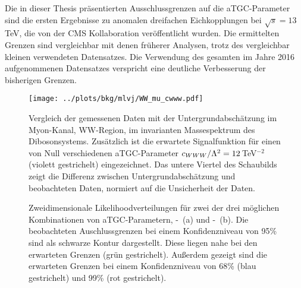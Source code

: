 Die in dieser Thesis präsentierten Ausschlussgrenzen auf die aTGC-Parameter sind die ersten Ergebnisse zu anomalen dreifachen Eichkopplungen bei $\sqrt{s}=13$\,TeV, die von der CMS Kollaboration veröffentlicht wurden. Die ermittelten Grenzen sind vergleichbar mit denen früherer Analysen, trotz des vergleichbar kleinen verwendeten Datensatzes. Die Verwendung des gesamten im Jahre 2016 aufgenommenen Datensatzes verspricht eine deutliche Verbesserung der bisherigen Grenzen.


\begin{figure}
    \centering
    \resizebox{0.8\columnwidth}{!}
    {%
    \texttt{[image: ../plots/bkg/mlvj/WW\_mu\_cwww.pdf]}
    \caption[Vergleich der gemessenen Daten mit der Untergrundabschätzung sowie zweidimensionale Ausschlussgrenzen auf \Tccw -\Tcb]{Vergleich der gemessenen Daten mit der Untergrundabschätzung im Myon-Kanal, WW-Region, im invarianten Massespektrum des Dibosonsystems. Zusätzlich ist die erwartete Signalfunktion für einen von Null verschiedenen aTGC-Parameter $c_{WWW}/\Lambda^2=12$\,TeV$^{-2}$ (violett gestrichelt) eingezeichnet. Das untere Viertel des Schaubilds zeigt die Differenz zwischen Untergrundabschätzung und beobachteten Daten, normiert auf die Unsicherheit der Daten.}
    \label{fig:intro_ger:WW}
    }
\end{figure}

\begin{figure}
	\centering
	\caption[Zweidimensionale Likelihoodverteilungen für zwei mögliche Kombinationen von aTGC-Parametern]{Zweidimensionale Likelihoodverteilungen für zwei der drei möglichen Kombinationen von aTGC-Parametern, \Tcwww -\Tcb \ (a) und \Tccw -\Tcb \ (b). Die beobachteten Auschlussgrenzen bei einem Konfidenzniveau von 95\% sind als schwarze Kontur dargestellt. Diese liegen nahe bei den erwarteten Grenzen (grün gestrichelt). Außerdem gezeigt sind die erwarteten Grenzen bei einem Konfidenzniveau von 68\% (blau gestrichelt) und 99\% (rot gestrichelt).}
	\label{fig:intro_ger:2d}	
\end{figure}
